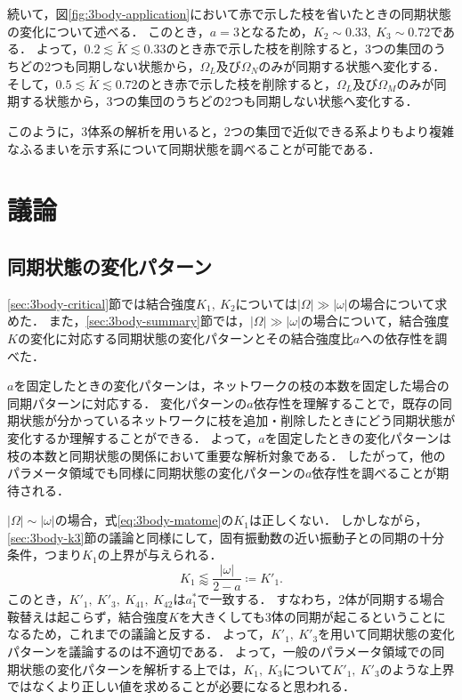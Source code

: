 \documentclass[../main]{subfiles}
\begin{document}
続いて，図\ref{fig:3body-application}において赤で示した枝を省いたときの同期状態の変化について述べる．
このとき，$a=3$となるため，$K_2\sim 0.33,\ K_3\sim 0.72$である．
よって，$0.2\lesssim \tilde{K}\lesssim 0.33$のとき赤で示した枝を削除すると，3つの集団のうちどの2つも同期しない状態から，$\Omega_L$及び$\Omega_N$のみが同期する状態へ変化する．
そして，$0.5\lesssim \tilde{K}\lesssim 0.72$のとき赤で示した枝を削除すると，$\Omega_L$及び$\Omega_M$のみが同期する状態から，3つの集団のうちどの2つも同期しない状態へ変化する．

このように，3体系の解析を用いると，2つの集団で近似できる系よりもより複雑なふるまいを示す系について同期状態を調べることが可能である．


\section{議論}
\label{sec:3body-discussion}
\subsection{同期状態の変化パターン}
\ref{sec:3body-critical}節では結合強度$K_1,\ K_2$については$|\Omega|\gg|\omega|$の場合について求めた．
また，\ref{sec:3body-summary}節では，$|\Omega|\gg|\omega|$の場合について，結合強度$K$の変化に対応する同期状態の変化パターンとその結合強度比$a$への依存性を調べた．

$a$を固定したときの変化パターンは，ネットワークの枝の本数を固定した場合の同期パターンに対応する．
変化パターンの$a$依存性を理解することで，既存の同期状態が分かっているネットワークに枝を追加・削除したときにどう同期状態が変化するか理解することができる．
よって，$a$を固定したときの変化パターンは枝の本数と同期状態の関係において重要な解析対象である．
したがって，他のパラメータ領域でも同様に同期状態の変化パターンの$a$依存性を調べることが期待される．

$|\Omega|\sim|\omega|$の場合，式\eqref{eq:3body-matome}の$K_1$は正しくない．
しかしながら，\ref{sec:3body-k3}節の議論と同様にして，固有振動数の近い振動子との同期の十分条件，つまり$K_1$の上界が与えられる．
\begin{equation}
    \label{K1-approx-dash}
    K_1\lessapprox\frac{|\omega|}{2-a}\coloneqq K'_1.
\end{equation}
このとき，$K'_1,\ K'_3,\ K_{41},\ K_{42}$は$a^\ast_1$で一致する．
すなわち，2体が同期する場合鞍替えは起こらず，結合強度$K$を大きくしても3体の同期が起こるということになるため，これまでの議論と反する．
よって，$K'_1,\ K'_3$を用いて同期状態の変化パターンを議論するのは不適切である．
よって，一般のパラメータ領域での同期状態の変化パターンを解析する上では，$K_1,\ K_3$について$K'_1,\ K'_3$のような上界ではなくより正しい値を求めることが必要になると思われる．
\end{document}
